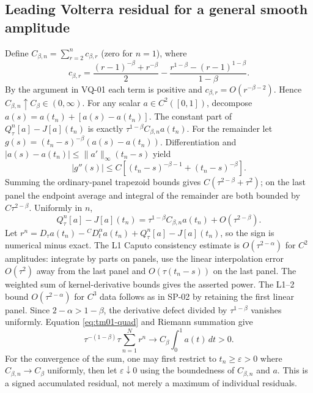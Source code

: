 \documentclass[11pt,a4paper]{amsart}
\theoremstyle{remark}
\theoremstyle{plain}
\theoremstyle{remark}
\numberwithin{equation}{section}
\begin{document}
\subsection{Leading Volterra residual for a general smooth amplitude}
Define $C_{\beta,n}=\sum_{r=2}^n c_{\beta,r}$ (zero for $n=1$), where
\[
 c_{\beta,r}=\frac{(r-1)^{-\beta}+r^{-\beta}}2-\frac{r^{1-\beta}-(r-1)^{1-\beta}}{1-\beta}.
\]
By the argument in VQ-01 each term is positive and $c_{\beta,r}=O(r^{-\beta-2})$. Hence $C_{\beta,n}\uparrow C_\beta\in(0,\infty)$. For any scalar $a\in C^2([0,1])$, decompose $a(s)=a(t_n)+[a(s)-a(t_n)]$. The constant part of $Q^n_\tau[a]-J[a](t_n)$ is exactly $\tau^{1-\beta}C_{\beta,n}a(t_n)$. For the remainder let $g(s)=(t_n-s)^{-\beta}(a(s)-a(t_n))$. Differentiation and $|a(s)-a(t_n)|\le\|a'\|_\infty(t_n-s)$ yield
\[
 |g''(s)|\le C[(t_n-s)^{-\beta-1}+(t_n-s)^{-\beta}].
\]
Summing the ordinary-panel trapezoid bounds gives $C(\tau^{2-\beta}+\tau^2)$; on the last panel the endpoint average and integral of the remainder are both bounded by $C\tau^{2-\beta}$. Uniformly in $n$,
\begin{equation}\label{eq:tm01-quad}
 Q_\tau^n[a]-J[a](t_n)=\tau^{1-\beta} C_{\beta,n}a(t_n)+O(\tau^{2-\beta}).
\end{equation}
Let $r^n=D_\tau a(t_n)-{}^CD_t^\alpha a(t_n)+Q_\tau^n[a]-J[a](t_n)$, so the sign is numerical minus exact. The L1 Caputo consistency estimate is $O(\tau^{2-\alpha})$ for $C^2$ amplitudes: integrate by parts on panels, use the linear interpolation error $O(\tau^2)$ away from the last panel and $O(\tau(t_n-s))$ on the last panel. The weighted sum of kernel-derivative bounds gives the asserted power. The L1--2 bound $O(\tau^{2-\alpha})$ for $C^3$ data follows as in SP-02 by retaining the first linear panel. Since $2-\alpha>1-\beta$, the derivative defect divided by $\tau^{1-\beta}$ vanishes uniformly. Equation \eqref{eq:tm01-quad} and Riemann summation give
\begin{equation}\label{eq:tm01-res-sum}
 \tau^{-(1-\beta)}\tau\sum_{n=1}^N r^n\longrightarrow C_\beta\int_0^1 a(t)\,dt>0.
\end{equation}
For the convergence of the sum, one may first restrict to $t_n\ge\varepsilon>0$ where $C_{\beta,n}\to C_\beta$ uniformly, then let $\varepsilon\downarrow0$ using the boundedness of $C_{\beta,n}$ and $a$. This is a signed accumulated residual, not merely a maximum of individual residuals.
\end{document}
